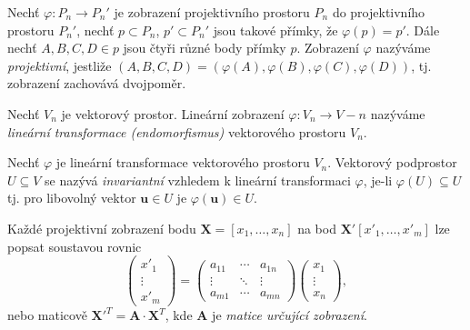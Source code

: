 \begin{definice}
	Nechť $\varphi:P_n\to P_n'$ je zobrazení projektivního prostoru $P_n$ do projektivního prostoru $P_n'$, nechť $p\subset P_n$, $p'\subset P_n'$ jsou takové přímky, že $\varphi\left(p\right)=p'$. Dále nechť $A,B,C,D\in p$ jsou čtyři různé body přímky $p$. Zobrazení $\varphi$ nazýváme \emph{projektivní}, jestliže \linebreak $\left(A,B,C,D\right)=\left(\varphi\left(A\right),\varphi\left(B\right),\varphi\left(C\right),\varphi\left(D\right)\right)$, tj. zobrazení zachovává dvojpoměr.
\end{definice}

\begin{definice}
	Nechť $V_n$ je vektorový prostor. Lineární zobrazení $\varphi: V_n\to V-n$ nazýváme \emph{lineární transformace (endomorfismus)} vektorového prostoru $V_n$.
\end{definice}

\begin{definice}
	Nechť $\varphi$ je lineární transformace vektorového prostoru $V_n$. Vektorový podprostor $U\subseteq V$ se nazývá \emph{invariantní} vzhledem k lineární transformaci $\varphi$, je-li $\varphi\left(U\right)\subseteq U$ tj. pro libovolný vektor $\mathbf{u}\in U$ je $\varphi\left(\mathbf{u}\right)\in U$.
\end{definice}

\begin{definice}
	Každé projektivní zobrazení bodu $\mathbf{X}=\left[x_1,\dots,x_n\right]$ na bod $\mathbf{X'}\left[x'_1,\dots,x'_m\right]$ lze popsat soustavou rovnic
	\begin{equation}
		\begin{pmatrix}
		x'_1 \\ 
		\vdots \\ 
		x'_m
		\end{pmatrix}
		=
		\begin{pmatrix}
		a_{11} & \cdots & a_{1n} \\ 
		\vdots & \ddots & \vdots \\ 
		a_{m1} & \cdots & a_{mn} 
		\end{pmatrix}
		\begin{pmatrix}
		x_1 \\ 
		\vdots \\ 
		x_n
		\end{pmatrix},
	\end{equation}
	nebo maticově ${\mathbf{X}'}^{T}=\mathbf{A}\cdot\mathbf{X}^T$, kde $\mathbf{A}$ je \emph{matice určující zobrazení}.
\end{definice}

